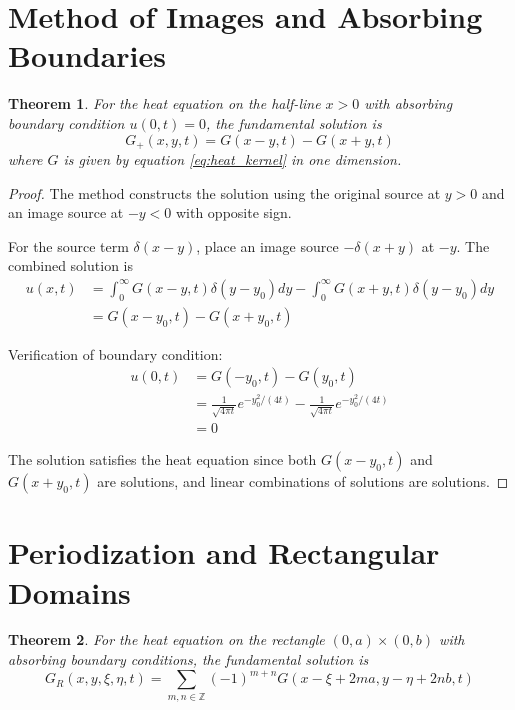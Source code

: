 \documentclass{article}
\newtheorem{theorem}{Theorem}
\begin{document}
\section{Method of Images and Absorbing Boundaries}

\begin{theorem}
For the heat equation on the half-line $x > 0$ with absorbing boundary condition $u(0,t) = 0$, the fundamental solution is
\begin{equation}
\label{eq:half_line_solution}
G_+(x,y,t) = G(x-y,t) - G(x+y,t)
\end{equation}
where $G$ is given by equation \eqref{eq:heat_kernel} in one dimension.
\end{theorem}

\begin{proof}
The method constructs the solution using the original source at $y > 0$ and an image source at $-y < 0$ with opposite sign.

For the source term $\delta(x-y)$, place an image source $-\delta(x+y)$ at $-y$. The combined solution is
\begin{align}
u(x,t) &= \int_0^{\infty} G(x-y,t) \delta(y-y_0) dy - \int_0^{\infty} G(x+y,t) \delta(y-y_0) dy \label{eq:superposition}\\
&= G(x-y_0,t) - G(x+y_0,t) \label{eq:evaluation}
\end{align}

Verification of boundary condition:
\begin{align}
u(0,t) &= G(-y_0,t) - G(y_0,t) \label{eq:boundary_check}\\
&= \frac{1}{\sqrt{4\pi t}} e^{-y_0^2/(4t)} - \frac{1}{\sqrt{4\pi t}} e^{-y_0^2/(4t)} \label{eq:symmetry}\\
&= 0 \label{eq:boundary_satisfied}
\end{align}

The solution satisfies the heat equation since both $G(x-y_0,t)$ and $G(x+y_0,t)$ are solutions, and linear combinations of solutions are solutions.
\end{proof}

\section{Periodization and Rectangular Domains}

\begin{theorem}
For the heat equation on the rectangle $(0,a) \times (0,b)$ with absorbing boundary conditions, the fundamental solution is
\begin{equation}
\label{eq:rectangle_solution}
G_R(x,y,\xi,\eta,t) = \sum_{m,n \in \mathbb{Z}} (-1)^{m+n} G(x-\xi+2ma, y-\eta+2nb, t)
\end{equation}
\end{theorem}
\end{document}
